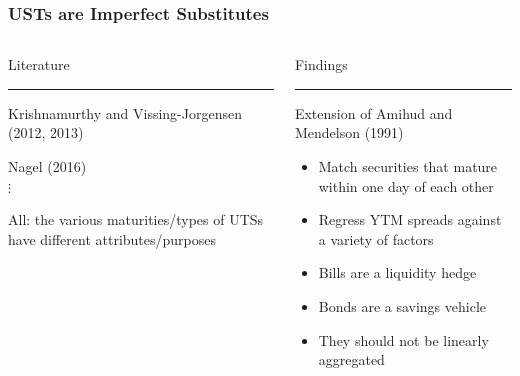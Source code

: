 \documentclass[11pt, handout, aspectratio=169]{beamer}
\newenvironment{wideitemize}{\itemize\addtolength{\itemsep}{10pt}}{\enditemize}
\begin{document}
\begin{frame}
	\frametitle{USTs are Imperfect Substitutes}
	\vspace{-2em}
	\begin{columns}[t]
		\begin{column}{0.49\textwidth}
			\begin{center}
				\Large \textcolor{WeberPurple}{Literature}
			\end{center} \vspace{-.2in}
			{\color{WeberPurple}\rule{\linewidth}{2pt}}
			\begin{wideitemize}
				\item Krishnamurthy and Vissing-Jorgensen (2012, 2013)
				\item Nagel (2016) \\ $\vdots$
				\item All: the various maturities/types of UTSs have different attributes/purposes
			\end{wideitemize}
		\end{column}
		\hfill
		\begin{column}{0.49\textwidth}
			\begin{center}
				\Large \textcolor{WeberPurple}{Findings}
			\end{center} \vspace{-.2in}
			{\color{WeberPurple}\rule{\linewidth}{2pt}}
			\begin{wideitemize}
				\item Extension of Amihud and Mendelson (1991)
				\begin{itemize}
					\item Match securities that mature within one day of each other
					\item Regress YTM spreads against a variety of factors
				\end{itemize}
				\item {\bf \color{WeberPurple}{Contribution}}
				\begin{itemize}
					\item Bills are a liquidity hedge
					\item Bonds are a savings vehicle
					\item They should not be linearly aggregated 
				\end{itemize}
			\end{wideitemize}
		\end{column}
	\end{columns}
\end{frame}
\end{document}
